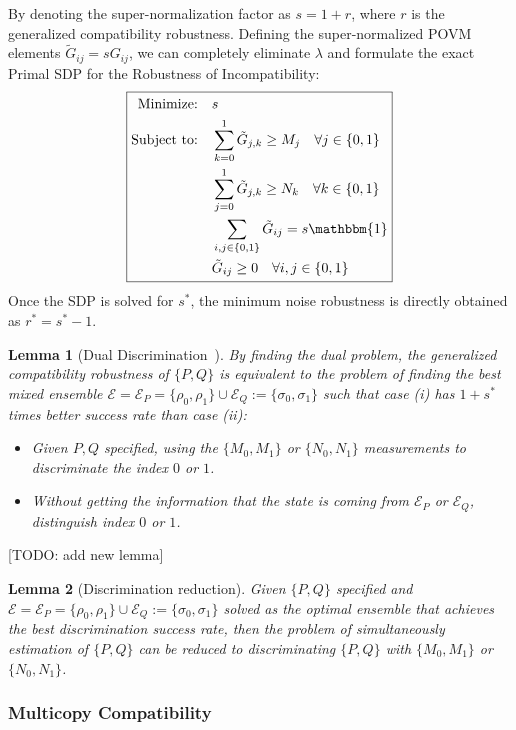 \documentclass[aps,%
twocolumn,%
floatfix,%
pra,%
amsfonts,%
groupedaddress,%
superscriptaddress]{revtex4-2}%
\newtheorem{lemma}{Lemma}
\newcommand{\1}{\mathbbm{1}}
\begin{document}
By denoting the super-normalization factor as $s = 1+r$, where $r$ is the generalized compatibility robustness. Defining the super-normalized POVM elements $\tilde{G}_{ij} = s G_{ij}$, we can completely eliminate $\lambda$ and formulate the exact Primal SDP for the Robustness of Incompatibility:
$$
\boxed{
\begin{aligned}
\text{Minimize:} \quad & s \\
\text{Subject to:} \quad & \sum_{k = 0}^{1}\tilde{G}_{j,k} \geq M_{j} \quad \forall j \in \{0,1\} \\
& \sum_{j = 0}^{1}\tilde{G}_{j,k} \geq N_{k} \quad \forall k \in \{0,1\} \\
& \sum_{i,j \in \{0,1\}} \tilde{G}_{ij} = s\1 \\
& \tilde{G}_{ij} \geq 0 \quad \forall i,j \in \{0,1\}
\end{aligned}
}
$$
Once the SDP is solved for $s^*$, the minimum noise robustness is directly obtained as $r^* = s^* - 1$.

\begin{lemma}[Dual Discrimination~\cite{skrzypczyk2019all}]
By finding the dual problem, the generalized compatibility robustness of $\{P,Q\}$ is equivalent to the problem of finding the best mixed ensemble $\mathcal{E} = \mathcal{E}_P = \{\rho_0,\rho_1\} \cup \mathcal{E}_Q := \{\sigma_0,\sigma_1\}$ such that case (i) has $1 +s^*$ times better success rate than case (ii):
\begin{itemize}
    \item  Given $P,Q$ specified, using the $\{M_0, M_1\}$ or $\{N_0, N_1\}$ measurements to discriminate the index $0$ or $1$.
    \item  Without getting the information that the state is coming from $\mathcal{E}_P$ or $\mathcal{E}_Q$, distinguish index $0$ or $1$.
\end{itemize}
\end{lemma}
\color{red}
[TODO: add new lemma]\
\begin{lemma}[Discrimination reduction]
Given $\{P,Q\}$ specified and $\mathcal{E} = \mathcal{E}_P = \{\rho_0,\rho_1\} \cup \mathcal{E}_Q := \{\sigma_0,\sigma_1\}$  solved as the optimal ensemble that achieves the best discrimination success rate, then the problem of simultaneously estimation of $\{P,Q\}$ can be reduced to discriminating $\{P,Q\}$ with $\{M_0, M_1\}$ or $\{N_0, N_1\}$.
\end{lemma}
\color{black}

\subsubsection{Multicopy Compatibility}
\end{document}
